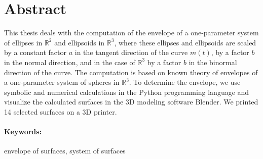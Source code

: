 \documentclass[12pt, twoside]{book}
\theoremstyle{definition}
\begin{document}
\section*{Abstract} 
\noindent This thesis deals with the computation of the envelope of a one-parameter system of ellipses in $\mathbb{R}^2$ and ellipsoids in $\mathbb{R}^3$, where these ellipses and ellipsoids are scaled by a constant factor $a$ in the tangent direction of the curve $m(t)$, by a factor $b$ in the normal direction, and in the case of $\mathbb{R}^3$ by a factor $b$ in the binormal direction of the curve. The computation is based on known  theory of envelopes of a one-parameter system of spheres in $\mathbb{R}^3$. To determine the envelope, we use symbolic and numerical calculations in the Python programming language and visualize the calculated surfaces in the 3D modeling software Blender. We printed 14 selected surfaces on a 3D printer.


\paragraph*{Keywords:} envelope of surfaces, system of surfaces


%
%



\newpage 

\tableofcontents



\newpage 
\listoffigures
\listoftables
\end{document}
